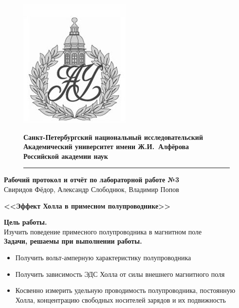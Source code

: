 \documentclass[a4paper]{article}
\begin{document}
	\begin{figure}[htb]
		\begin{minipage}[c]{0.12\textwidth}
			\includegraphics[scale=0.25]{AU}
		\end{minipage}
		\hfill
		\begin{minipage}[t]{0.9\textwidth}
			{\Large\bfseries Санкт-Петербургский национальный исследовательский Академический университет имени Ж.И.~Алфёрова\\Российской академии наук}
		\end{minipage}
		\rule{164mm}{0.3mm}
	\end{figure}
	
	\begin{center}
		{\large\textbf{Рабочий протокол и отчёт по лабораторной работе №3 }}\\
		Свиридов Фёдор, Александр Слободнюк, Владимир Попов
	\end{center}
	\begin{center}
		\Large\bfseries{<<Эффект Холла в примесном полупроводнике>>}\\
	\end{center}
	{\parindent=0pt\textbf{Цель работы.}}\\
	Изучить поведение примесного полупроводника в магнитном поле\\
	
	{\parindent=0pt\textbf{Задачи, решаемы при выполнении работы.}}
	\begin{itemize}
		\item Получить вольт-амперную характеристику полупроводника
		\item Получить зависимость ЭДС Холла от силы внешнего магнитного поля
		\item Косвенно измерить удельную проводимость полупроводника, постоянную Холла, концентрацию свободных носителей зарядов и их подвижность
	\end{itemize}
\end{document}
